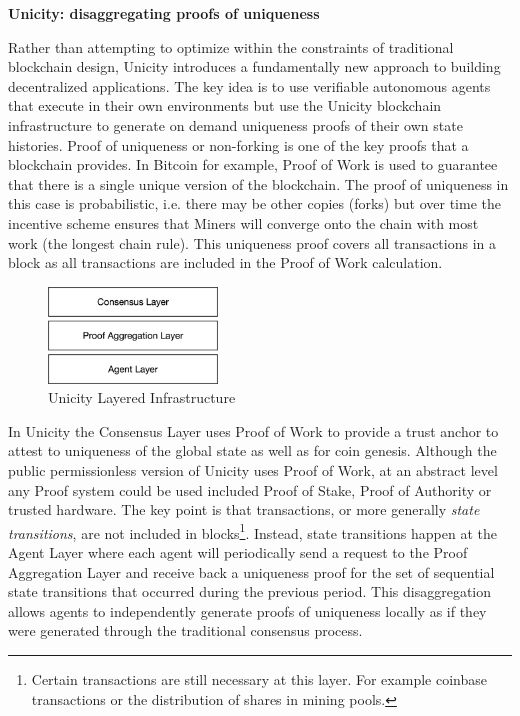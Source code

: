 \documentclass{article}
\begin{document}
\textbf{Unicity: disaggregating proofs of uniqueness}
\vspace{2mm}


Rather than attempting to optimize within the constraints of traditional blockchain design, Unicity introduces a fundamentally new approach to building decentralized applications. The key idea is to use verifiable autonomous agents that execute in their own environments but use the Unicity blockchain infrastructure to generate on demand uniqueness proofs of their own state histories. Proof of uniqueness or non-forking is one of the key proofs that a blockchain provides. In Bitcoin for example, Proof of Work is used to guarantee that there is a single unique version of the blockchain. The proof of uniqueness in this case is probabilistic, i.e. there may be other copies (forks) but over time the incentive scheme ensures that Miners will converge onto the chain with most work (the longest chain rule). This uniqueness proof covers all transactions in a block as all transactions are included in the Proof of Work calculation. 


\begin{figure}[htbp]
    \centering
    \includegraphics[width=0.4\textwidth]{ThreeLayers.png}
    \caption{Unicity Layered Infrastructure}
    \label{fig:layers}
\end{figure}


In Unicity the Consensus Layer uses Proof of Work to provide a trust anchor to attest to uniqueness of the global state as well as for coin genesis. Although the public permissionless version of Unicity uses Proof of Work,  at an abstract level any Proof system could be used included Proof of Stake, Proof of Authority or trusted hardware. The key point is that transactions, or more generally \textit{state transitions}, are not included in blocks\footnote{Certain transactions are still necessary at this layer. For example coinbase transactions or the distribution of shares in mining pools.}. Instead, state transitions happen at the Agent Layer where each agent will periodically send a request to the Proof Aggregation Layer and receive back a uniqueness proof for the set of sequential state transitions that occurred during the previous period. This disaggregation allows agents to independently generate proofs of uniqueness locally as if they were generated through the traditional consensus process. 
\end{document}
